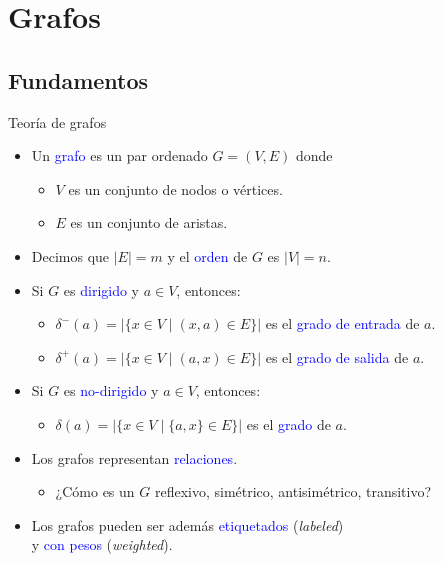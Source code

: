 \documentclass{beamer} %
\newcommand{\blue}[1]{\textcolor{blue}{#1}}
\begin{document}

\section{Grafos}

\subsection{Fundamentos}

\begin{frame}{Teoría de grafos}
    \begin{itemize}
        \item<1-> Un \blue{grafo} es un par ordenado $G=(V,E)$ donde
        \begin{itemize}
            \item $V$ es un conjunto de nodos o vértices.
            \item $E$ es un conjunto de aristas.
        \end{itemize}
        \item<2-> Decimos que $|E|=m$ y el \blue{orden} de $G$ es $|V|=n$.
        \item<3-> Si $G$ es \blue{dirigido} y $a\in V$, entonces: 
        \begin{itemize}
            \item $\delta^-(a)=|\{x\in V\mid (x,a)\in E\}|$ es el \blue{grado de entrada} de $a$.
            \item $\delta^+(a)=|\{x\in V\mid (a,x)\in E\}|$ es el \blue{grado de salida} de $a$.
        \end{itemize}
        \item<3-> Si $G$ es \blue{no-dirigido} y $a\in V$, entonces:
        \begin{itemize}
            \item $\delta(a)=|\{x\in V\mid \{a,x\}\in E\}|$ es el \blue{grado} de $a$.
        \end{itemize}
        \item<4-> Los grafos representan \blue{relaciones}.
        \begin{itemize}
            \item ¿Cómo es un $G$ reflexivo, simétrico, antisimétrico, transitivo?
        \end{itemize}
        \item<5-> Los grafos pueden ser además \blue{etiquetados} ({\em labeled})\\ y \blue{con pesos} ({\em weighted}).
    \end{itemize}
\end{frame}
\end{document}
